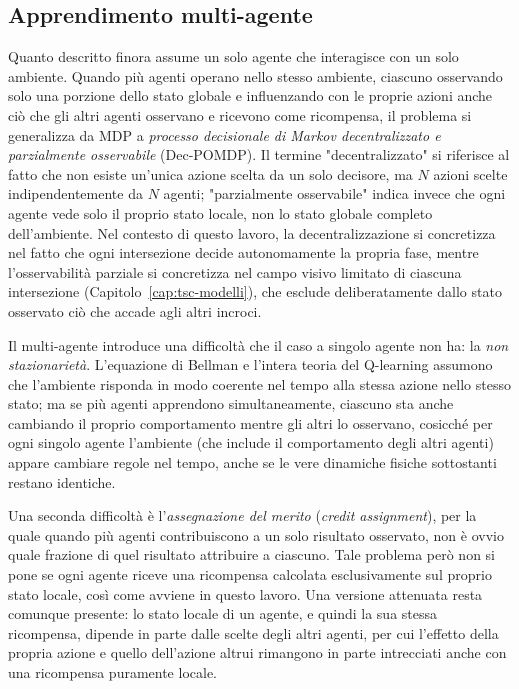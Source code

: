 \subsection{Apprendimento multi-agente}
\label{subsec:marl}

Quanto descritto finora assume un solo agente che interagisce con
un solo ambiente. Quando più agenti operano nello stesso ambiente,
ciascuno osservando solo una porzione dello stato globale e influenzando
con le proprie azioni anche ciò che gli altri agenti osservano e
ricevono come ricompensa, il problema si generalizza da MDP a
\emph{processo decisionale di Markov decentralizzato e parzialmente
  osservabile} (Dec-POMDP). Il termine "decentralizzato" si riferisce al fatto che non esiste un'unica
azione scelta da un solo decisore, ma $N$ azioni scelte
indipendentemente da $N$ agenti; "parzialmente osservabile" indica invece che ogni
agente vede solo il proprio stato locale, non lo stato globale
completo dell'ambiente. Nel contesto di questo lavoro, la decentralizzazione si concretizza nel fatto che
ogni intersezione decide autonomamente la propria fase, mentre l'osservabilità
parziale si concretizza nel campo visivo limitato di ciascuna intersezione
(Capitolo~\ref{cap:tsc-modelli}), che esclude deliberatamente
dallo stato osservato ciò che accade agli altri incroci.

Il multi-agente introduce una difficoltà che il caso a singolo agente non
ha: la \emph{non stazionarietà}. L'equazione di Bellman e l'intera teoria
del Q-learning assumono che l'ambiente risponda in modo coerente nel
tempo alla stessa azione nello stesso stato; ma se più agenti apprendono
simultaneamente, ciascuno sta anche cambiando il proprio comportamento
mentre gli altri lo osservano, cosicché per ogni singolo agente
l'ambiente (che include il comportamento degli altri agenti) appare
cambiare regole nel tempo, anche se le vere dinamiche fisiche sottostanti
restano identiche.

Una seconda difficoltà è
l'\emph{assegnazione del merito} (\emph{credit assignment}), per la quale quando più
agenti contribuiscono a un solo risultato osservato, non è ovvio quale
frazione di quel risultato attribuire a ciascuno. Tale problema però non si pone se ogni agente riceve una ricompensa
calcolata esclusivamente sul proprio stato locale, così come avviene in questo lavoro.
Una versione attenuata resta comunque presente: lo stato locale di un agente, e
quindi la sua stessa ricompensa, dipende in parte dalle scelte degli altri agenti, per cui
l'effetto della propria azione e quello dell'azione altrui rimangono in
parte intrecciati anche con una ricompensa puramente locale.

